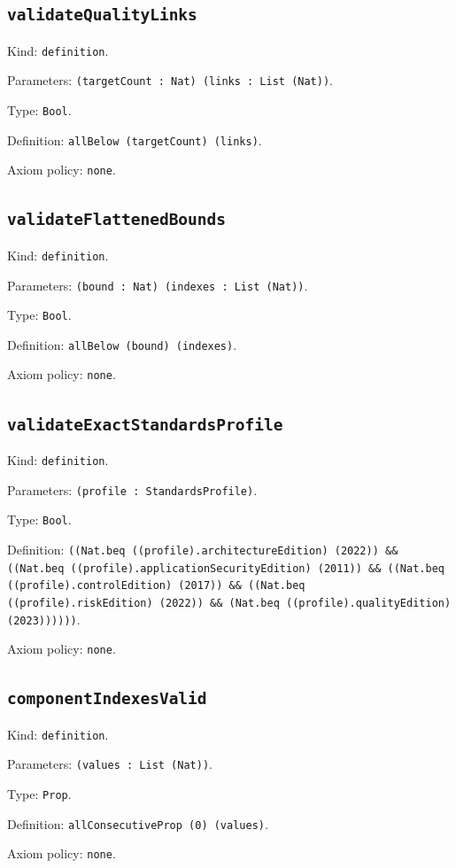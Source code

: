 \documentclass[11pt]{article}
\begin{document}
\subsection*{\texttt{validateQualityLinks}}
\noindent Kind: \texttt{definition}.\par
\noindent Parameters: \texttt{(targetCount : Nat) (links : List (Nat))}.\par
\noindent Type: \texttt{Bool}.\par
\noindent Definition: \texttt{allBelow (targetCount) (links)}.\par
\noindent Axiom policy: \texttt{none}.\par
\subsection*{\texttt{validateFlattenedBounds}}
\noindent Kind: \texttt{definition}.\par
\noindent Parameters: \texttt{(bound : Nat) (indexes : List (Nat))}.\par
\noindent Type: \texttt{Bool}.\par
\noindent Definition: \texttt{allBelow (bound) (indexes)}.\par
\noindent Axiom policy: \texttt{none}.\par
\subsection*{\texttt{validateExactStandardsProfile}}
\noindent Kind: \texttt{definition}.\par
\noindent Parameters: \texttt{(profile : StandardsProfile)}.\par
\noindent Type: \texttt{Bool}.\par
\noindent Definition: \texttt{((Nat.beq ((profile).architectureEdition) (2022)) \&\& ((Nat.beq ((profile).applicationSecurityEdition) (2011)) \&\& ((Nat.beq ((profile).controlEdition) (2017)) \&\& ((Nat.beq ((profile).riskEdition) (2022)) \&\& (Nat.beq ((profile).qualityEdition) (2023))))))}.\par
\noindent Axiom policy: \texttt{none}.\par
\subsection*{\texttt{componentIndexesValid}}
\noindent Kind: \texttt{definition}.\par
\noindent Parameters: \texttt{(values : List (Nat))}.\par
\noindent Type: \texttt{Prop}.\par
\noindent Definition: \texttt{allConsecutiveProp (0) (values)}.\par
\noindent Axiom policy: \texttt{none}.\par
\end{document}
